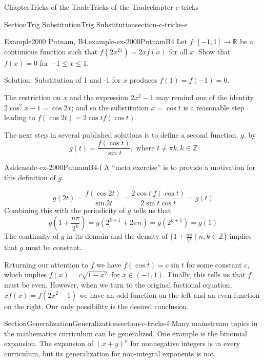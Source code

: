 \documentclass[oneside,10pt,]{book}
\numberwithin{equation}{section}
\begin{document}
\begin{chapterptx}{Chapter}{Tricks of the Trade}{}{Tricks of the Trade}{}{}{chapter-c-tricks}
\begin{sectionptx}{Section}{Trig Substitution}{}{Trig Substitution}{}{}{section-c-tricks-e}
\begin{example}{Example}{2000 Putnam, B4.}{example-ex-2000PutnamB4}
Let \(f:[-1,1]\rightarrow \mathbb{R}\) be a continuous function such that \(f(2x^21)=2xf(x)\) for all \(x\). Show that \(f(x)=0\) for \(-1 \leq x \leq 1\).%
\par
Solution: Substitution of 1 and -1 for \(x\) produces \(f(1)=f(-1)=0\).%
\par
The restriction on \(x\) and the expression \(2 x^2 -1\) may remind one of the identity \(2\cos^2{x} - 1 = \cos{2 x}\); and so the substitution \(x = \cos{t}\) is a reasonable step leading to \(f(\cos{2t})=2 \cos{t} f(\cos{t})\).%
\par
The next step in several published solutions is to define a second function, \(g\), by%
\begin{equation*}
g(t)=\frac{f(\cos{t})}{\sin{t}}, \textrm{ where } t\neq \pi k, k\in \mathbb{Z}
\end{equation*}
%
\begin{aside}{Aside}{}{aside-ex-2000PutnamB4-f}%
A ``meta exercise'' is to provide a motivation for this definition of \(g\).%
\end{aside}
%
\begin{equation*}
g(2t)=\frac{f(\cos{2t})}{\sin{2t}}=\frac{2 \cos{t}\: f(\cos{t})}{2\sin{t}\cos{t}}=g(t)
\end{equation*}
Combining this with the periodicity of \(g\) tells us that%
\begin{equation*}
g(1+\frac{n \pi}{2^k})=g(2^{k+1}+2 \pi n) = g(2^{k+1})=g(1)
\end{equation*}
The continuity of \(g\) in its domain and the density of \(\{1+\frac{n \pi}{2^k} \mid n,k \in \mathbb{Z}\}\) implies that \(g\) must be constant.%
\par
Returning our attention to \(f\) we have \(f(\cos{t})= c \sin{t}\) for some constant \(c\), which implies \(f(x) = c \sqrt{1-x^2}\) for \(x \in (-1,1)\).  Finally, this tells us that \(f\) must be even.  However, when we turn to the original fuctional equation, \(x f(x)=f(2x^2-1)\) we have an odd function on the left and an even function on the right.  Our only possibility is the desired conclusion.%
\end{example}
\end{sectionptx}
%
%
\typeout{************************************************}
\typeout{************************************************}
%
\begin{sectionptx}{Section}{Generalization}{}{Generalization}{}{}{section-c-tricks-f}
Many mainstream topics in the mathematics curriculum can be generalized. One example is the binomial expansion.  The expansion of \((x+y)^n\) for nonnegative integers is in every curriculum, but its generalization for non-integral exponents is not.%

\end{sectionptx}
\end{chapterptx}
\end{document}
